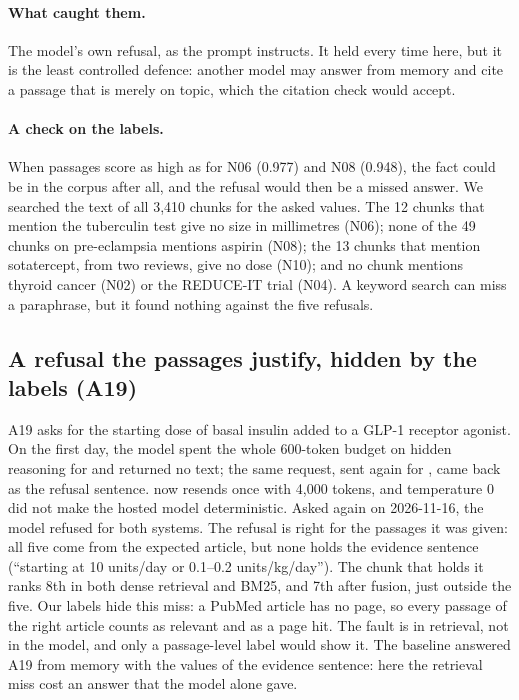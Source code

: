 \paragraph{What caught them.} The model's own refusal, as the prompt instructs. It held every time here, but it is the least controlled defence: another model may answer from memory and cite a passage that is merely on topic, which the citation check would accept.

\paragraph{A check on the labels.} When passages score as high as for N06 (0.977) and N08 (0.948), the fact could be in the corpus after all, and the refusal would then be a missed answer. We searched the text of all 3,410 chunks for the asked values. The 12 chunks that mention the tuberculin test give no size in millimetres (N06); none of the 49 chunks on pre-eclampsia mentions aspirin (N08); the 13 chunks that mention sotatercept, from two reviews, give no dose (N10); and no chunk mentions thyroid cancer (N02) or the REDUCE-IT trial (N04). A keyword search can miss a paraphrase, but it found nothing against the five refusals.

\subsection{A refusal the passages justify, hidden by the labels (A19)}

A19 asks for the starting dose of basal insulin added to a GLP-1 receptor agonist. On the first day, the model spent the whole 600-token budget on hidden reasoning for  and returned no text; the same request, sent again for , came back as the refusal sentence.  now resends once with 4,000 tokens, and temperature 0 did not make the hosted model deterministic. Asked again on 2026-11-16, the model refused for both systems. The refusal is right for the passages it was given: all five come from the expected article, but none holds the evidence sentence (``starting at 10 units/day or 0.1--0.2 units/kg/day''). The chunk that holds it ranks 8th in both dense retrieval and BM25, and 7th after fusion, just outside the five. Our labels hide this miss: a PubMed article has no page, so every passage of the right article counts as relevant and as a page hit. The fault is in retrieval, not in the model, and only a passage-level label would show it. The  baseline answered A19 from memory with the values of the evidence sentence: here the retrieval miss cost an answer that the model alone gave.

